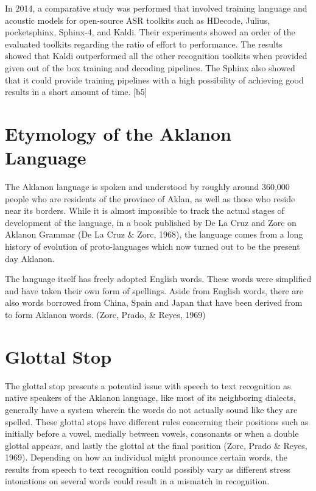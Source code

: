 In 2014, a comparative study was performed that involved training language and acoustic models for open-source ASR toolkits such as HDecode, Julius, pocketsphinx, Sphinx-4, and Kaldi. Their experiments showed an order of the evaluated toolkits regarding the ratio of effort to performance. The results showed that Kaldi outperformed all the other recognition toolkits when provided given out of the box training and decoding pipelines. The Sphinx also showed that it could provide training pipelines with a high possibility of achieving good results in a short amount of time.  [b5]


\section{Etymology of the Aklanon Language}

The Aklanon language is spoken and understood by roughly around 360,000 people who are residents of the province of Aklan, as well as those who reside near its borders. While it is almost impossible to track the actual stages of development of the language, in a book published by De La Cruz and Zorc on Aklanon Grammar (De La Cruz \& Zorc, 1968), the language comes from a long history of evolution of proto-languages which now turned out to be the present day Aklanon. 

The language itself has freely adopted English words. These words were simplified and have taken their own form of spellings. Aside from English words, there are also words borrowed from China, Spain and Japan that have been derived from to form Aklanon words. (Zorc, Prado, \& Reyes, 1969)

\section{Glottal Stop}

The glottal stop presents a potential issue with speech to text recognition as native speakers of the Aklanon language, like most of its neighboring dialects, generally have a system wherein the words do not actually sound like they are spelled. These glottal stops have different rules concerning their positions such as initially before a vowel, medially between vowels, consonants or when a double glottal appears, and lastly the glottal at the final position (Zorc, Prado \& Reyes, 1969). Depending on how an individual might pronounce certain words, the results from speech to text recognition could possibly vary as different stress intonations on several words could result in a mismatch in recognition.

